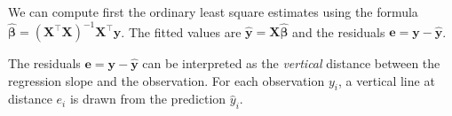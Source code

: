 \documentclass[]{book}
\newenvironment{Shaded}{\begin{snugshade}}{\end{snugshade}}
\newcommand{\CommentTok}[1]{\textcolor[rgb]{0.56,0.35,0.01}{\textit{#1}}}
\newcommand{\DataTypeTok}[1]{\textcolor[rgb]{0.13,0.29,0.53}{#1}}
\newcommand{\DecValTok}[1]{\textcolor[rgb]{0.00,0.00,0.81}{#1}}
\newcommand{\KeywordTok}[1]{\textcolor[rgb]{0.13,0.29,0.53}{\textbf{#1}}}
\newcommand{\NormalTok}[1]{#1}
\newcommand{\OperatorTok}[1]{\textcolor[rgb]{0.81,0.36,0.00}{\textbf{#1}}}
\newcommand{\StringTok}[1]{\textcolor[rgb]{0.31,0.60,0.02}{#1}}
\theoremstyle{definition}
\theoremstyle{definition}
\theoremstyle{definition}
\theoremstyle{remark}
\begin{document}
We can compute first the ordinary least square estimates using the
formula
\(\hat{\boldsymbol{\beta}} = (\mathbf{X}^\top\mathbf{X})^{-1}\mathbf{X}^\top\boldsymbol{y}\).
The fitted values are
\(\hat{\boldsymbol{y}} = \mathbf{X}\hat{\boldsymbol{\beta}}\) and the
residuals \(\boldsymbol{e} = \boldsymbol{y} - \hat{\boldsymbol{y}}\).

\begin{Shaded}
\end{Shaded}

The residuals \(\boldsymbol{e} = \boldsymbol{y} -\hat{\boldsymbol{y}}\)
can be interpreted as the \emph{vertical} distance between the
regression slope and the observation. For each observation \(y_i\), a
vertical line at distance \(e_i\) is drawn from the prediction
\(\hat{y}_i\).
\end{document}
